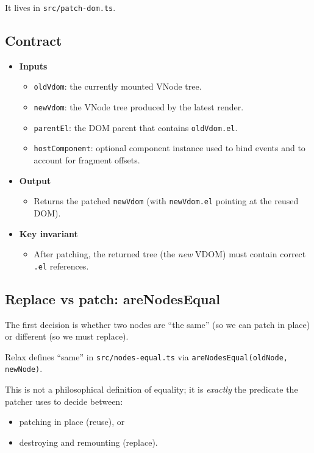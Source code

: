 It lives in \texttt{src/patch-dom.ts}.

\subsection{Contract}

\begin{itemize}
  \item \textbf{Inputs}
    \begin{itemize}
      \item \texttt{oldVdom}: the currently mounted VNode tree.
      \item \texttt{newVdom}: the VNode tree produced by the latest render.
      \item \texttt{parentEl}: the DOM parent that contains \texttt{oldVdom.el}.
      \item \texttt{hostComponent}: optional component instance used to bind events and to account for fragment offsets.
    \end{itemize}
  \item \textbf{Output}
    \begin{itemize}
      \item Returns the patched \texttt{newVdom} (with \texttt{newVdom.el} pointing at the reused DOM).
    \end{itemize}
  \item \textbf{Key invariant}
    \begin{itemize}
      \item After patching, the returned tree (the \emph{new} VDOM) must contain correct \texttt{.el} references.
    \end{itemize}
\end{itemize}

\subsection{Replace vs patch: areNodesEqual}

The first decision is whether two nodes are ``the same'' (so we can patch in place) or different (so we must replace).

Relax defines ``same'' in \texttt{src/nodes-equal.ts} via \texttt{areNodesEqual(oldNode, newNode)}.

This is not a philosophical definition of equality; it is \emph{exactly} the predicate the patcher uses to decide between:

\begin{itemize}
  \item patching in place (reuse), or
  \item destroying and remounting (replace).
\end{itemize}

